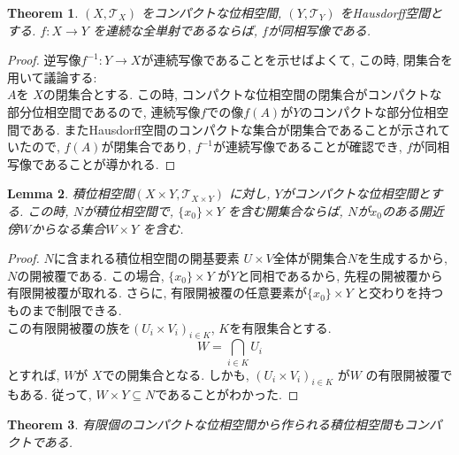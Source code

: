 \documentclass[dvipdfmx]{jbook}
\newtheorem{theorem}{Theorem}[section]
\newtheorem{lemma}[theorem]{Lemma}
\theoremstyle{remark}
\theoremstyle{plain}
\begin{document}
\begin{theorem}
	$\left( X , \mathcal{T}_{X} \right)$ をコンパクトな位相空間, $\left( Y , \mathcal{T}_{Y} \right)$ をHausdorff空間とする. $f: X \to Y$ を連続な全単射であるならば, $f$が同相写像である.
\end{theorem}

\begin{proof}
	逆写像$f^{-1} :Y \to X$が連続写像であることを示せばよくて, この時, 閉集合を用いて議論する:\\
	$A$を $X$の閉集合とする. この時, コンパクトな位相空間の閉集合がコンパクトな部分位相空間であるので,  連続写像$f$での像$f(A)$が$Y$のコンパクトな部分位相空間である. 
	またHausdorff空間のコンパクトな集合が閉集合であることが示されていたので, $f(A)$が閉集合であり,  $f^{-1}$が連続写像であることが確認でき, $f$が同相写像であることが導かれる.
\end{proof}

\begin{lemma}
	積位相空間$\left( X\times Y , \mathcal{T}_{X\times Y} \right)$ に対し, $Y$がコンパクトな位相空間とする. 
	この時,  $N$が積位相空間で,  $\{x_0\} \times Y$ を含む開集合ならば,
	$N$が$x_0$のある開近傍$W$からなる集合$W\times Y$ を含む.
\end{lemma}

\begin{proof}
	$N$に含まれる積位相空間の開基要素 $ U\times V $全体が開集合$N$を生成するから,  $N$の開被覆である. この場合,  $\{x_0\} \times Y$ が$Y$と同相であるから, 先程の開被覆から有限開被覆が取れる. さらに,  有限開被覆の任意要素が$\{x_0\} \times Y $ と交わりを持つものまで制限できる. \\
	この有限開被覆の族を$\left( U_i \times V_i \right) _{i\in K}$, $K$を有限集合とする. 
	$$
	W=\bigcap_{i \in K}U_i 
	$$
	とすれば, $W$が $X$での開集合となる. しかも,  $\left( U_i \times V_i \right) _{i \in K}$ が$W$ の有限開被覆でもある. 従って, $W \times Y\subseteq N$であることがわかった.
\end{proof}

\begin{theorem}
	有限個のコンパクトな位相空間から作られる積位相空間もコンパクトである.
\end{theorem}
\end{document}
